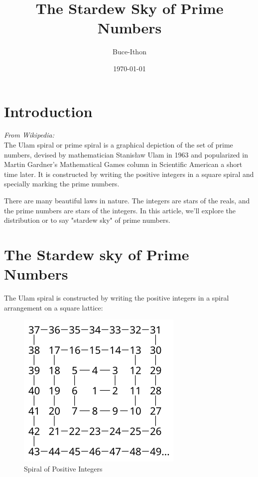 \documentclass{Math_Note}
\title{The Stardew Sky of Prime Numbers}
\author{Buce-Ithon}
\date{\today}
\begin{document}
\maketitle

\newpage
\tableofcontents
\newpage

\section{Introduction}

\begin{mdframed}
    \textit{From Wikipedia:}\\
    The Ulam spiral or prime spiral is a graphical depiction of the set of prime numbers, devised by mathematician Stanisław Ulam in 1963 
    and popularized in Martin Gardner's Mathematical Games column in Scientific American a short time later. It is constructed by writing 
    the positive integers in a square spiral and specially marking the prime numbers.
\end{mdframed}

There are many beautiful laws in nature. The integers are stars of the reals, and the prime numbers are stars of the integers. In this article, 
we'll explore the distribution or to say "stardew sky" of prime numbers.

\section{The Stardew sky of Prime Numbers}

The Ulam spiral is constructed by writing the positive integers in a spiral arrangement on a square lattice:

\begin{figure}[H]
    \centering
    \includegraphics[scale=0.32]{"./Figures/Ulam_spiral_1.png"}
    \caption{Spiral of Positive Integers}
\end{figure}
\end{document}

